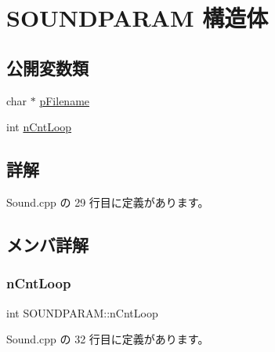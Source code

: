 \hypertarget{struct_s_o_u_n_d_p_a_r_a_m}{}\section{S\+O\+U\+N\+D\+P\+A\+R\+AM 構造体}
\label{struct_s_o_u_n_d_p_a_r_a_m}
\subsection*{公開変数類}
\begin{DoxyCompactItemize}
\item 
char $\ast$ \mbox{\hyperlink{struct_s_o_u_n_d_p_a_r_a_m_a7e1fb1b63606df49ae9f1b0b7c6df85f}{p\+Filename}}
\item 
int \mbox{\hyperlink{struct_s_o_u_n_d_p_a_r_a_m_a3e150cf96706aae747ffa2fefe63d48e}{n\+Cnt\+Loop}}
\end{DoxyCompactItemize}


\subsection{詳解}


 Sound.\+cpp の 29 行目に定義があります。



\subsection{メンバ詳解}
\mbox{\label{struct_s_o_u_n_d_p_a_r_a_m_a3e150cf96706aae747ffa2fefe63d48e}} 
\subsubsection{\texorpdfstring{n\+Cnt\+Loop}{nCntLoop}}
{\footnotesize\ttfamily int S\+O\+U\+N\+D\+P\+A\+R\+A\+M\+::n\+Cnt\+Loop}



 Sound.\+cpp の 32 行目に定義があります。

\mbox{\label{struct_s_o_u_n_d_p_a_r_a_m_a7e1fb1b63606df49ae9f1b0b7c6df85f}} 
